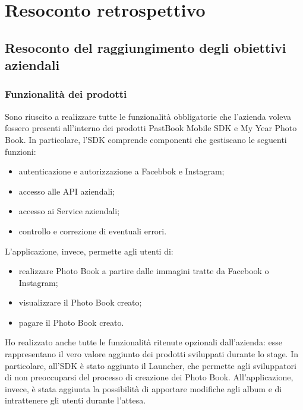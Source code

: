 \chapter{Resoconto retrospettivo}
	\section{Resoconto del raggiungimento degli obiettivi aziendali}
		\subsection{Funzionalità dei prodotti}
			Sono riuscito a realizzare tutte le funzionalità obbligatorie che l'azienda voleva fossero presenti all'interno dei prodotti
			PastBook Mobile SDK e My Year Photo Book. In particolare, l'SDK comprende componenti che gestiscano le seguenti funzioni:
			\begin{itemize}
				\item autenticazione e autorizzazione a Facebbok e Instagram;
				\item accesso alle API aziendali;
				\item accesso ai Service aziendali;
				\item controllo e correzione di eventuali errori.
			\end{itemize}
			L'applicazione, invece, permette agli utenti di:
			\begin{itemize}
				\item realizzare Photo Book a partire dalle immagini tratte da Facebook o Instagram;
				\item visualizzare il Photo Book creato;
				\item pagare il Photo Book creato.
			\end{itemize}
			Ho realizzato anche tutte le funzionalità ritenute opzionali dall'azienda: esse rappresentano il vero valore aggiunto dei
			prodotti sviluppati durante lo stage. In particolare, all'SDK è stato aggiunto il Launcher, che permette agli sviluppatori di
			non preoccuparsi del processo di creazione dei Photo Book. All'applicazione, invece, è stata aggiunta la possibilità di
			apportare modifiche agli album e di intrattenere gli utenti durante l'attesa.
